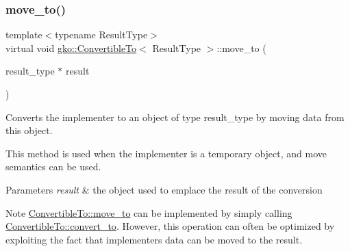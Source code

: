 \mbox{\label{classgko_1_1ConvertibleTo_ab9047c7c49e0f83c79b54c0034d6197b}} 
\subsubsection{\texorpdfstring{move\+\_\+to()}{move\_to()}}
{\footnotesize\ttfamily template$<$typename Result\+Type$>$ \\
virtual void \hyperlink{classgko_1_1ConvertibleTo}{gko\+::\+Convertible\+To}$<$ Result\+Type $>$\+::move\+\_\+to (\begin{DoxyParamCaption}\item[{result\+\_\+type $\ast$}]{result }\end{DoxyParamCaption})\hspace{0.3cm}{\ttfamily [pure virtual]}}



Converts the implementer to an object of type result\+\_\+type by moving data from this object. 

This method is used when the implementer is a temporary object, and move semantics can be used.


\begin{DoxyParams}{Parameters}
{\em result} & the object used to emplace the result of the conversion\\
\hline
\end{DoxyParams}
\begin{DoxyNote}{Note}
\hyperlink{classgko_1_1ConvertibleTo_ab9047c7c49e0f83c79b54c0034d6197b}{Convertible\+To\+::move\+\_\+to} can be implemented by simply calling \hyperlink{classgko_1_1ConvertibleTo_aa7f3420babcbed39ee15bc020bed4f7e}{Convertible\+To\+::convert\+\_\+to}. However, this operation can often be optimized by exploiting the fact that implementer\textquotesingle{}s data can be moved to the result. 
\end{DoxyNote}



